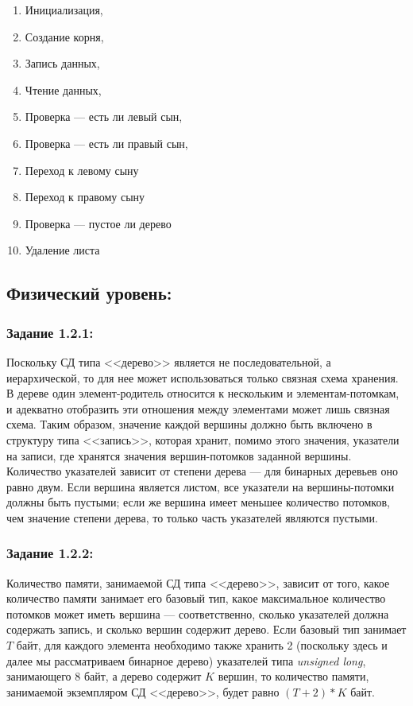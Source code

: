 \documentclass[12pt]{article}
\begin{document}
{	\begin{enumerate}
	\item Инициализация,
	\item Создание корня,
	\item Запись данных,
	\item Чтение данных,
	\item Проверка — есть ли левый сын,
	\item Проверка — есть ли правый сын,
	\item Переход к левому сыну
	\item Переход к правому сыну
	\item Проверка — пустое ли дерево
	\item Удаление листа
	\end{enumerate}
	
	\subsection{Физический уровень:}
	\label{task_1_2}
	\subsubsection{Задание 1.2.1:}
	\label{task_1_2_1}
	Поскольку СД типа <<дерево>> является не последовательной, а иерархической, то для нее может использоваться только связная схема хранения. В дереве один элемент-родитель относится к нескольким и элементам-потомкам, и адекватно отобразить эти отношения между элементами может лишь связная схема. Таким образом, значение каждой вершины должно быть включено в структуру типа <<запись>>, которая хранит, помимо этого значения, указатели на записи, где хранятся значения вершин-потомков заданной вершины. Количество указателей зависит от степени дерева --- для бинарных деревьев оно равно двум. Если вершина является листом, все указатели на вершины-потомки должны быть пустыми; если же вершина имеет меньшее количество потомков, чем значение степени дерева, то только часть указателей являются пустыми.
	
	\subsubsection{Задание 1.2.2:}
	\label{task_1_2_2}
	Количество памяти, занимаемой СД типа <<дерево>>, зависит от того, какое количество памяти занимает его базовый тип, какое максимальное количество потомков может иметь вершина --- соответственно, сколько указателей должна содержать запись, и сколько вершин содержит дерево. Если базовый тип занимает $T$ байт, для каждого элемента необходимо также хранить 2 (поскольку здесь и далее мы рассматриваем бинарное дерево) указателей типа {\it unsigned long}, занимающего 8 байт, а дерево содержит $K$ вершин, то количество памяти, занимаемой экземпляром СД <<дерево>>, будет равно $(T+2)*K$ байт.
	
}
\end{document}
